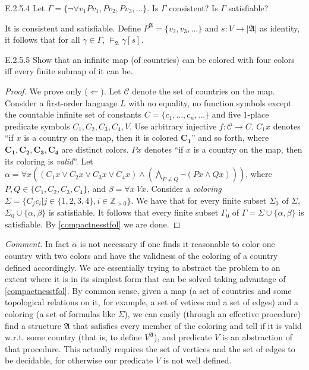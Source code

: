\setcounter{exercise}{3}

\begin{exercise}{E.2.5.4}
  Let $\Gamma=\{\neg\forall v_1 P v_1, Pv_2, Pv_3,\dots\}.$ Is $\Gamma$ consistent? Is $\Gamma$ satisfiable?
\end{exercise}

It is consistent and satisfiable. Define $P^{\mathfrak{A}}=\{v_2,v_3,\dots\}$ and $s:V\rightarrow|\mathfrak{A}|$ as identity, it follows that for all $\gamma\in \Gamma$, $\vDash_{\mathfrak{A}}\gamma[s]$.

\begin{exercise}{E.2.5.5}
  Show that an infinite map (of countries) can be colored with four colors iff every finite submap of it can be.
\end{exercise}

\begin{proof}
  We prove only ($\Leftarrow$). Let $\mathcal{C}$ denote the set of countries on the map. Consider a first-order language $L$ with no equality, no function symbols except the countable infinite set of constants $C=\{c_1,\dots,c_n,\dots\}$ and five $1$-place predicate symbols $C_1,C_2,C_3,C_4,V$. Use arbitrary injective $f:\mathcal{C}\rightarrow C$. $C_1x$ denotes ``if $x$ is a country on the map, then it is colored $\mathbf{C_1}$'' and so forth, where $\mathbf{C_1,C_2,C_3,C_4}$ are distinct colors. $Px$ denotes ``if $x$ is a country on the map, then its coloring is \textit{valid}''. Let $\alpha=\forall x ((C_1x\vee C_2x\vee C_3x\vee C_4x)\wedge (\bigwedge_{P\neq Q}\neg(Px\wedge Qx)))$, where $P,Q\in\{C_1,C_2,C_3,C_4\}$, and $\beta=\forall x\ Vx$. Consider a \textit{coloring} $\Sigma=\{C_jc_i|j\in\{1,2,3,4\}, i\in\mathbb{Z}_{>0}\}$. We have that for every finite subset $\Sigma_0$ of $\Sigma$, $\Sigma_0\cup\{\alpha,\beta\}$ is satisfiable. It follows that every finite subset $\Gamma_0$ of $\Gamma=\Sigma\cup\{\alpha,\beta\}$ is satisfiable. By \ref{compactnesstfol} we are done.
\end{proof}

\textit{Comment.} In fact $\alpha$ is not necessary if one finds it reasonable to color one country with two colors and have the validness of the coloring of a country defined accordingly. We are essentially trying to abstract the problem to an extent where it is in its simplest form that can be solved taking advantage of \ref{compactnesstfol}. By common sense, given a map (a set of countries and some topological relations on it, for example, a set of vetices and a set of edges) and a coloring (a set of formulas like $\Sigma$), we can easily (through an effective procedure) find a structure $\mathfrak{A}$ that safisfies every member of the coloring and tell if it is valid w.r.t. some country (that is, to define $V^{\mathfrak{A}}$), and predicate $V$ is an abstraction of that procedure. This actually requires the set of vertices and the set of edges to be decidable, for otherwise our predicate $V$ is not well defined.

